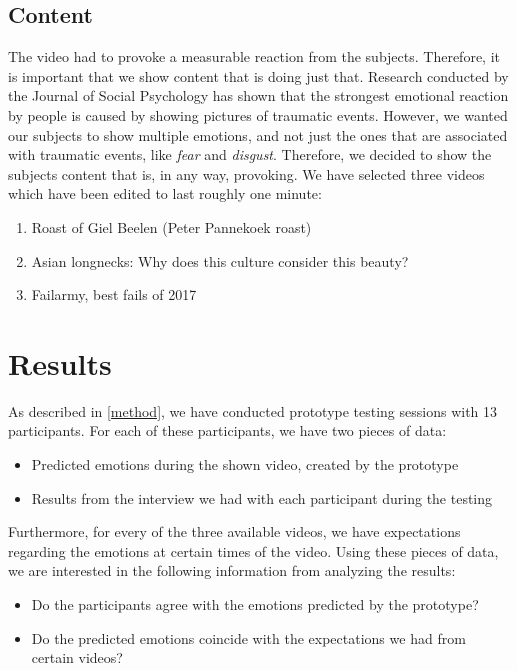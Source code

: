 \documentclass[sigconf]{acmart}
\begin{document}
\subsection{Content}
The video had to provoke a measurable reaction from the subjects. Therefore, it is important that we show content
that is doing just that. Research conducted by the Journal of Social Psychology \cite{leary2015seemingly}
has shown that the strongest emotional reaction by people is caused by showing pictures of traumatic events.
However, we wanted our subjects to show multiple emotions, and not just the ones that are associated with
traumatic events, like \emph{fear} and \emph{disgust}. Therefore, we decided to show the subjects content
that is, in any way, provoking. We have selected three videos which have been edited to last roughly one minute:
\begin{enumerate}
    \item{Roast of Giel Beelen (Peter Pannekoek roast)}
    \item{Asian longnecks: Why does this culture consider this beauty?}
    \item{Failarmy, best fails of 2017}
\end{enumerate}


\section{Results}
As described in \ref{method}, we have conducted prototype testing sessions with 13 participants. For each of these
participants, we have two pieces of data:
\begin{itemize}
    \item{Predicted emotions during the shown video, created by the prototype}
    \item{Results from the interview we had with each participant during the testing}
\end{itemize}
Furthermore, for every of the three available videos, we have expectations regarding the emotions at certain
times of the video. Using these pieces of data, we are interested in the following information from analyzing
the results:
\begin{itemize}
    \item{Do the participants agree with the emotions predicted by the prototype?}
    \item{Do the predicted emotions coincide with the expectations we had from certain videos?}
\end{itemize}
\end{document}
